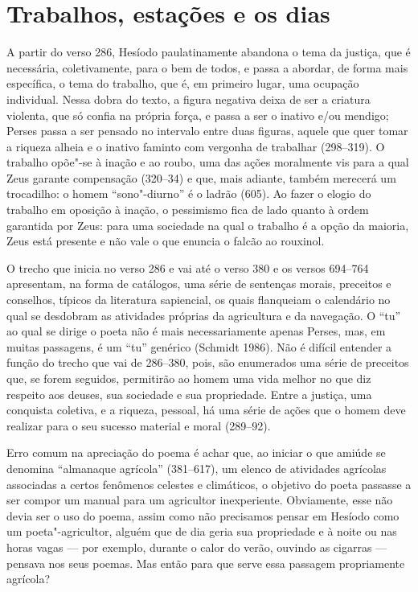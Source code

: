 \section{Trabalhos, estações e os dias}

A partir do verso 286, Hesíodo paulatinamente abandona o tema da
justiça, que é necessária, coletivamente, para o bem de todos, e passa a
abordar, de forma mais específica, o tema do trabalho, que é, em
primeiro lugar, uma ocupação individual. Nessa dobra do texto, a figura
negativa deixa de ser a criatura violenta, que só confia na própria
força, e passa a ser o inativo e/ou mendigo; Perses passa a ser pensado
no intervalo entre duas figuras, aquele que quer tomar a riqueza alheia
e o inativo faminto com vergonha de trabalhar (298--319). O trabalho
opõe"-se à inação e ao roubo, uma das ações moralmente vis para a qual
Zeus garante compensação (320--34) e que, mais adiante, também merecerá
um trocadilho: o homem ``sono"-diurno'' é o ladrão (605). Ao fazer o
elogio do trabalho em oposição à inação, o pessimismo fica de lado
quanto à ordem garantida por Zeus: para uma sociedade na qual o trabalho
é a opção da maioria, Zeus está presente e não vale o que enuncia o
falcão ao rouxinol.

O trecho que inicia no verso 286 e vai até o verso 380 e os versos
694--764 apresentam, na forma de catálogos, uma série de sentenças
morais, preceitos e conselhos, típicos da literatura sapiencial, os
quais flanqueiam o calendário no qual se desdobram as atividades
próprias da agricultura e da navegação. O ``tu'' ao qual se dirige o
poeta não é mais necessariamente apenas Perses, mas, em muitas
passagens, é um ``tu'' genérico (Schmidt 1986). Não é difícil entender a
função do trecho que vai de 286--380, pois, são enumerados uma série de
preceitos que, se forem seguidos, permitirão ao homem uma vida melhor no
que diz respeito aos deuses, sua sociedade e sua propriedade. Entre a
justiça, uma conquista coletiva, e a riqueza, pessoal, há uma série de
ações que o homem deve realizar para o seu sucesso material e moral
(289--92).

Erro comum na apreciação do poema é achar que, ao iniciar o que amiúde
se denomina ``almanaque agrícola'' (381--617), um elenco de atividades
agrícolas associadas a certos fenômenos celestes e climáticos, o
objetivo do poeta passasse a ser compor um manual para um agricultor
inexperiente. Obviamente, esse não devia ser o uso do poema, assim como
não precisamos pensar em Hesíodo como um poeta"-agricultor, alguém que de
dia geria sua propriedade e à noite ou nas horas vagas --- por exemplo,
durante o calor do verão, ouvindo as cigarras --- pensava nos seus
poemas. Mas então para que serve essa passagem propriamente agrícola?

